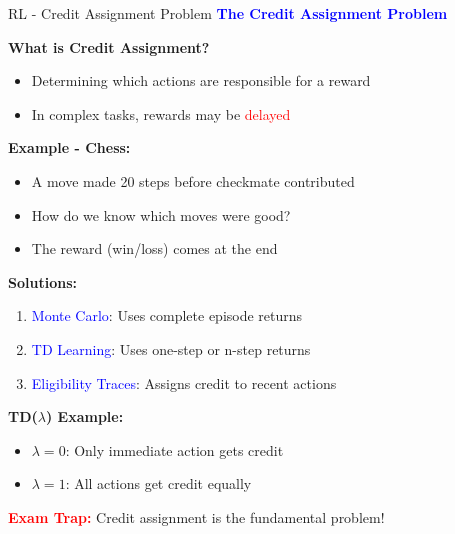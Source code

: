 \documentclass[8pt]{beamer}
\begin{document}
	\begin{frame}{RL - Credit Assignment Problem}
		\fontsize{6.5}{7.5}\selectfont
		\textcolor{blue}{\textbf{The Credit Assignment Problem}}
		
		\textbf{What is Credit Assignment?}
		\begin{itemize}
			\item Determining which actions are responsible for a reward
			\item In complex tasks, rewards may be \textcolor{red}{delayed}
		\end{itemize}
		
		\textbf{Example - Chess:}
		\begin{itemize}
			\item A move made 20 steps before checkmate contributed
			\item How do we know which moves were good?
			\item The reward (win/loss) comes at the end
		\end{itemize}
		
		\textbf{Solutions:}
		\begin{enumerate}
			\item \textcolor{blue}{Monte Carlo}: Uses complete episode returns
			\item \textcolor{blue}{TD Learning}: Uses one-step or n-step returns
			\item \textcolor{blue}{Eligibility Traces}: Assigns credit to recent actions
		\end{enumerate}
		
		\textbf{TD($\lambda$) Example:}
		\begin{itemize}
			\item $\lambda = 0$: Only immediate action gets credit
			\item $\lambda = 1$: All actions get credit equally
		\end{itemize}
		
		\textcolor{red}{\textbf{Exam Trap:}} Credit assignment is the fundamental problem!
	\end{frame}
	
\end{document}
